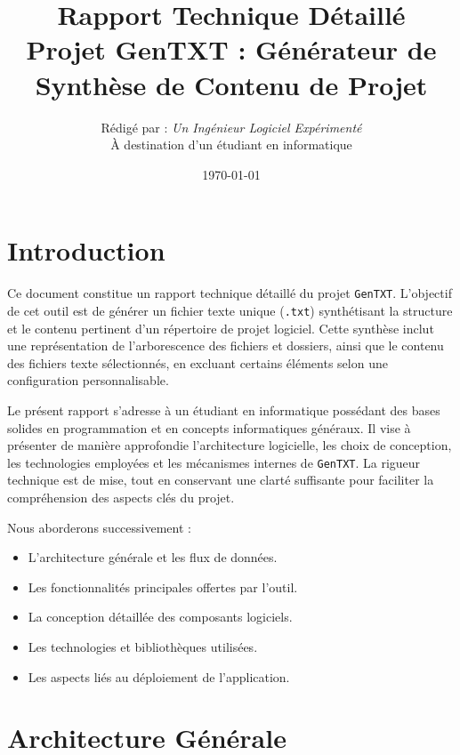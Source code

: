 \documentclass[11pt, a4paper]{article}
\title{
    \vspace{-1cm} %
    \textbf{Rapport Technique Détaillé} \\
    \large Projet GenTXT : Générateur de Synthèse de Contenu de Projet
    \vspace{0.5cm} %
}
\author{Rédigé par : \textit{Un Ingénieur Logiciel Expérimenté} \\
        À destination d'un étudiant en informatique}
\date{\today}
\begin{document}
\maketitle %

\newpage %

\tableofcontents %

\newpage %

\section{Introduction}

Ce document constitue un rapport technique détaillé du projet \texttt{GenTXT}. L'objectif de cet outil est de générer un fichier texte unique (\texttt{.txt}) synthétisant la structure et le contenu pertinent d'un répertoire de projet logiciel. Cette synthèse inclut une représentation de l'arborescence des fichiers et dossiers, ainsi que le contenu des fichiers texte sélectionnés, en excluant certains éléments selon une configuration personnalisable.

Le présent rapport s'adresse à un étudiant en informatique possédant des bases solides en programmation et en concepts informatiques généraux. Il vise à présenter de manière approfondie l'architecture logicielle, les choix de conception, les technologies employées et les mécanismes internes de \texttt{GenTXT}. La rigueur technique est de mise, tout en conservant une clarté suffisante pour faciliter la compréhension des aspects clés du projet.

Nous aborderons successivement :
\begin{itemize}
    \item L'architecture générale et les flux de données.
    \item Les fonctionnalités principales offertes par l'outil.
    \item La conception détaillée des composants logiciels.
    \item Les technologies et bibliothèques utilisées.
    \item Les aspects liés au déploiement de l'application.
\end{itemize}

\section{Architecture Générale}
\end{document}
